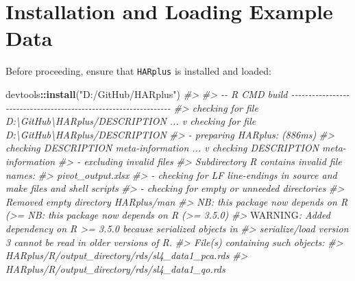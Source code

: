 \documentclass[
]{article}
\newenvironment{Shaded}{\begin{snugshade}}{\end{snugshade}}
\newcommand{\AlertTok}[1]{\textcolor[rgb]{0.94,0.16,0.16}{#1}}
\newcommand{\CommentTok}[1]{\textcolor[rgb]{0.56,0.35,0.01}{\textit{#1}}}
\newcommand{\FunctionTok}[1]{\textcolor[rgb]{0.13,0.29,0.53}{\textbf{#1}}}
\newcommand{\NormalTok}[1]{#1}
\newcommand{\SpecialCharTok}[1]{\textcolor[rgb]{0.81,0.36,0.00}{\textbf{#1}}}
\newcommand{\StringTok}[1]{\textcolor[rgb]{0.31,0.60,0.02}{#1}}
\begin{document}
\section{Installation and Loading Example
Data}\label{installation-and-loading-example-data}

Before proceeding, ensure that \texttt{HARplus} is installed and loaded:

\begin{Shaded}
\begin{Highlighting}[]
\NormalTok{devtools}\SpecialCharTok{::}\FunctionTok{install}\NormalTok{(}\StringTok{"D:/GitHub/HARplus"}\NormalTok{)}
\CommentTok{\#\textgreater{} }
\CommentTok{\#\textgreater{} {-}{-} R CMD build {-}{-}{-}{-}{-}{-}{-}{-}{-}{-}{-}{-}{-}{-}{-}{-}{-}{-}{-}{-}{-}{-}{-}{-}{-}{-}{-}{-}{-}{-}{-}{-}{-}{-}{-}{-}{-}{-}{-}{-}{-}{-}{-}{-}{-}{-}{-}{-}{-}{-}{-}{-}{-}{-}{-}{-}{-}{-}{-}{-}{-}{-}{-}{-}{-}}
\CommentTok{\#\textgreater{}          checking for file \textquotesingle{}D:\textbackslash{}GitHub\textbackslash{}HARplus/DESCRIPTION\textquotesingle{} ...  v  checking for file \textquotesingle{}D:\textbackslash{}GitHub\textbackslash{}HARplus/DESCRIPTION\textquotesingle{}}
\CommentTok{\#\textgreater{}       {-}  preparing \textquotesingle{}HARplus\textquotesingle{}: (886ms)}
\CommentTok{\#\textgreater{}    checking DESCRIPTION meta{-}information ...  v  checking DESCRIPTION meta{-}information}
\CommentTok{\#\textgreater{}       {-}  excluding invalid files}
\CommentTok{\#\textgreater{}    Subdirectory \textquotesingle{}R\textquotesingle{} contains invalid file names:}
\CommentTok{\#\textgreater{}      \textquotesingle{}pivot\_output.xlsx\textquotesingle{}}
\CommentTok{\#\textgreater{}       {-}  checking for LF line{-}endings in source and make files and shell scripts}
\CommentTok{\#\textgreater{}   {-}  checking for empty or unneeded directories}
\CommentTok{\#\textgreater{}      Removed empty directory \textquotesingle{}HARplus/man\textquotesingle{}}
\CommentTok{\#\textgreater{}      NB: this package now depends on R (\textgreater{}=        NB: this package now depends on R (\textgreater{}= 3.5.0)}
\CommentTok{\#\textgreater{}        }\AlertTok{WARNING}\CommentTok{: Added dependency on R \textgreater{}= 3.5.0 because serialized objects in}
\CommentTok{\#\textgreater{}      serialize/load version 3 cannot be read in older versions of R.}
\CommentTok{\#\textgreater{}      File(s) containing such objects:}
\CommentTok{\#\textgreater{}        \textquotesingle{}HARplus/R/output\_directory/rds/sl4\_data1\_pca.rds\textquotesingle{}}
\CommentTok{\#\textgreater{}        \textquotesingle{}HARplus/R/output\_directory/rds/sl4\_data1\_qo.rds\textquotesingle{}}

\end{Highlighting}
\end{Shaded}
\end{document}
